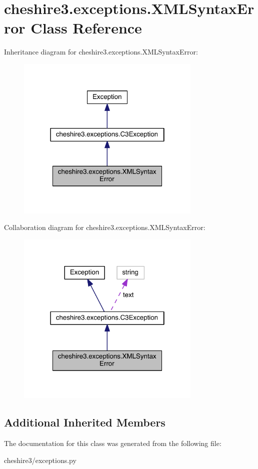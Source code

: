 \hypertarget{classcheshire3_1_1exceptions_1_1_x_m_l_syntax_error}{\section{cheshire3.\-exceptions.\-X\-M\-L\-Syntax\-Error Class Reference}
\label{classcheshire3_1_1exceptions_1_1_x_m_l_syntax_error}
}


Inheritance diagram for cheshire3.\-exceptions.\-X\-M\-L\-Syntax\-Error\-:
\nopagebreak
\begin{figure}[H]
\begin{center}
\leavevmode
\includegraphics[width=250pt]{classcheshire3_1_1exceptions_1_1_x_m_l_syntax_error__inherit__graph}
\end{center}
\end{figure}


Collaboration diagram for cheshire3.\-exceptions.\-X\-M\-L\-Syntax\-Error\-:
\nopagebreak
\begin{figure}[H]
\begin{center}
\leavevmode
\includegraphics[width=250pt]{classcheshire3_1_1exceptions_1_1_x_m_l_syntax_error__coll__graph}
\end{center}
\end{figure}
\subsection*{Additional Inherited Members}


The documentation for this class was generated from the following file\-:\begin{DoxyCompactItemize}
\item 
cheshire3/exceptions.\-py\end{DoxyCompactItemize}
